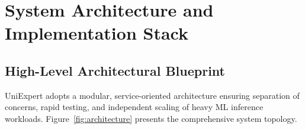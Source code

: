 \documentclass[11pt,a4paper]{article}
\begin{document}
\section{System Architecture and Implementation Stack}

\subsection{High-Level Architectural Blueprint}
UniExpert adopts a modular, service-oriented architecture ensuring separation of concerns, rapid testing, and independent scaling of heavy ML inference workloads. Figure~\ref{fig:architecture} presents the comprehensive system topology.
\end{document}
